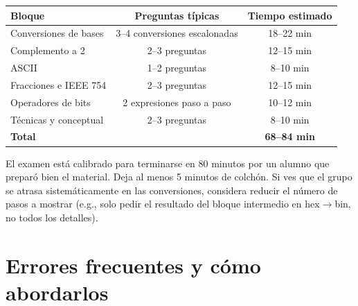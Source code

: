 \documentclass[12pt, oneside]{article}
\begin{document}
\begin{center}
\begin{tabular}{lcc}
  \toprule
  \textbf{Bloque} & \textbf{Preguntas típicas} & \textbf{Tiempo estimado} \\
  \midrule
  Conversiones de bases       & 3–4 conversiones escalonadas & 18–22 min \\
  Complemento a 2             & 2–3 preguntas                & 12–15 min \\
  ASCII                       & 1–2 preguntas                &  8–10 min \\
  Fracciones e IEEE 754       & 2–3 preguntas                & 12–15 min \\
  Operadores de bits          & 2 expresiones paso a paso    & 10–12 min \\
  Técnicas y conceptual       & 2–3 preguntas                &  8–10 min \\
  \midrule
  \textbf{Total}              &                              & \textbf{68–84 min} \\
  \bottomrule
\end{tabular}
\end{center}

\begin{notaprofesor}
  El examen está calibrado para terminarse en 80 minutos por un alumno
  que preparó bien el material.  Deja al menos 5 minutos de colchón.
  Si ves que el grupo se atrasa sistemáticamente en las conversiones,
  considera reducir el número de pasos a mostrar (e.g., solo pedir el resultado
  del bloque intermedio en hex$\to$bin, no todos los detalles).
\end{notaprofesor}

\section{Errores frecuentes y cómo abordarlos}
\end{document}
